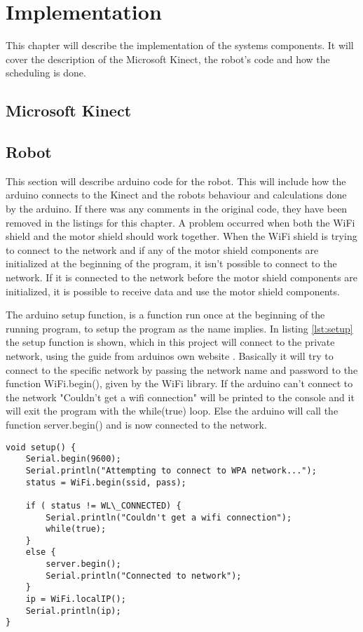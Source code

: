 \chapter{Implementation}
\label{chap:Implementation}
This chapter will describe the implementation of the systems components. It will cover the description of the Microsoft Kinect, the robot's code and how the scheduling is done. 

\section{Microsoft Kinect}
\label{sec:Microsoft Kinect Implementation}

\section{Robot}
\label{sec:Robot}
This section will describe arduino code for the robot. This will include how the arduino connects to the Kinect and the robots behaviour and calculations done by the arduino. If there was any comments in the original code, they have been removed in the listings for this chapter. \newline
A problem occurred when both the WiFi shield and the motor shield should work together. When the WiFi shield is trying to connect to the network and if any of the motor shield components are initialized at the beginning of the program, it isn't possible to connect to the network. If it is connected to the network before the motor shield components are initialized, it is possible to receive data and use the motor shield components.

The arduino setup function, is a function run once at the beginning of the running program, to setup the program as the name implies. In listing \ref{lst:setup} the setup function is shown, which in this project will connect to the private network, using the guide from arduinos own website \citep{wg}. \newline
Basically it will try to connect to the specific network by passing the network name and password to the function WiFi.begin(), given by the WiFi library. If the arduino can't connect to the network "Couldn't get a wifi connection" will be printed to the console and it will exit the program with the while(true) loop. Else the arduino will call the function server.begin() and is now connected to the network.

\begin{lstlisting}[caption={The arduino setup function}, label={lst:setup}]
void setup() {
	Serial.begin(9600);           
	Serial.println("Attempting to connect to WPA network...");
	status = WiFi.begin(ssid, pass);

	if ( status != WL\_CONNECTED) { 
		Serial.println("Couldn't get a wifi connection");
		while(true);
	} 
	else {
		server.begin();
		Serial.println("Connected to network");
	}	
	ip = WiFi.localIP();
	Serial.println(ip);
}
\end{lstlisting}

